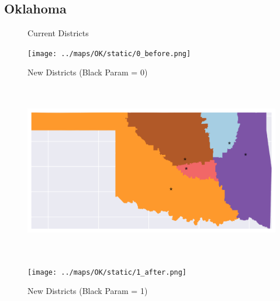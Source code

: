 \subsection{Oklahoma}
\begin{figure}[htb!] \centering
\caption{ Current Districts }
\texttt{[image: ../maps/OK/static/0\_before.png]}
\caption{ New Districts (Black Param = 0) }
\includegraphics[width=5in,height=3in,keepaspectratio]{../maps/OK/static/0_after.png}
\caption{ New Districts (Black Param = 1) }
\texttt{[image: ../maps/OK/static/1\_after.png]}
\end{figure}

\clearpage
\newpage

